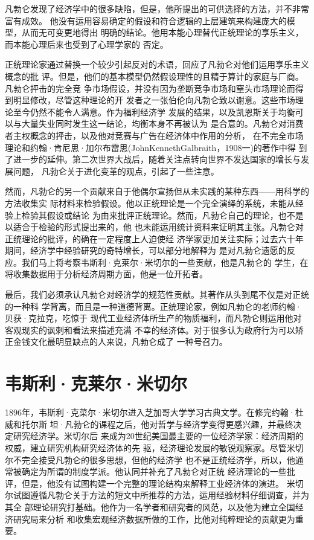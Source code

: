 凡勃仑发现了经济学中的很多缺陷，但是，他所提出的可供选择的方法，并不非常富有成效。
他没有运用容易确定的假设和符合逻辑的上层建筑来构建庞大的模型，从而无可变更地得出
明确的结论。他用本能心理替代正统理论的享乐主义，而本能心理后来也受到了心理学家的
否定。

正统理论家通过替换一个较少引起反对的术语，回应了凡勃仑对他们运用享乐主义概念的批
评。但是，他们的基本模型仍然假设理性的且精于算计的家庭与厂商。凡勃仑抨击的完全竞
争市场假设，并没有因为垄断竞争市场和窒头市场理论而得到明显修改，尽管这种理论的开
发者之一张伯伦向凡勃仑致以谢意。这些市场理论至今仍然不能令人满意。作为福利经济学
发展的结果，以及凯恩斯关于均衡可以与大量失业同时发生这一结论，均衡本身不再被认为
是合意的。凡勃仑对消费者主权概念的抨击，以及他对竞赛与广告在经济体中作用的分析，
在不完全市场理论和约翰·肯尼思·加尔布雷思(JohnKennethGalbraith，1908一)的著作中得
到了进一步的延伸。第二次世界大战后，随着关注点转向世界不发达国家的增长与发展问题，
凡勃仑关于进化变革的观点，引起了一些注意。

然而，凡勃仑的另一个贡献来自于他偶尔宣扬但从未实践的某种东西——用科学的方法收集实
际材料来检验假设。他以正统理论是一个完全演绎的系统，未能从经验上检验其假设或结论
为由来批评正统理论。然而，凡勃仑自己的理论，也不是以适合于检验的形式提出来的，他
也未能运用统计资料来证明其主张。凡勃仑对正统理论的批评，的确在一定程度上人迫使经
济学家更加关注实际；过去六十年期间，经济学中经验研究的奇特增长，可以部分地解释为
是对凡勃仑遗愿的反应。我们马上将考察韦斯利·克莱尔·米切尔的一些贡献，他是凡勃仑的
学生，在将收集数据用于分析经济周期方面，他是一位开拓者。

最后，我们必须承认凡勃仑对经济学的规范性贡献。其著作从头到尾不仅是对正统的一种科
学背离，而且是一种道德背离。正统理论家，例如凡勃仑的老师约翰·贝获·克拉克，吃惊于
现代工业经济体所生产的物质福利，而凡勃仑则运用他对客观现实的讽刺和看法来描述充满
不幸的经济体。对于很多认为政府行为可以矫正金钱文化最明显缺点的人来说，凡勃仑成了
一种号召力。

\section{韦斯利·克莱尔·米切尔}

1896年，韦斯利·克菜尔·米切尔进入芝加哥大学学习古典文学。在修完约翰·杜威和托尔斯
坦·凡勃仑的课程之后，他对哲学与经济学变得更感兴趣，并最终决定研究经济学。米切尔后
来成为20世纪美国最主要的一位经济学家：经济周期的权威，建立研究机构研究经济体的先
驱，经济理论发展的敏锐观察家。尽管米切尔不完全接受凡勃仑的很多思想，但他的经济学
也不是正统经济学，所以，他通常被确定为所谓的制度学派。他认同并补充了凡勃仑对正统
经济理论的一些批评，但是，他没有试图构建一个完整的理论结构来解释工业经济体的演进。
米切尔试图遵循凡勃仑关于方法的短文中所推荐的方法，运用经验材料仔细调查，并为其全
部理论研究打基础。他作为一名学者和研究者的风范，以及他为建立全国经济研究局来分析
和收集宏观经济数据所做的工作，比他对纯粹理论的贡献更为重要。

